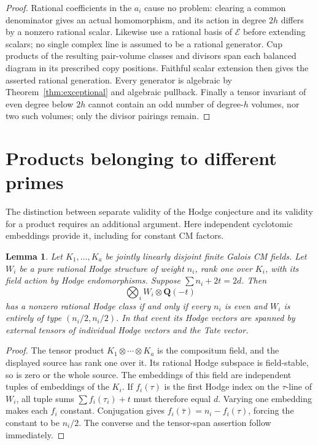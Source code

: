 \documentclass[11pt]{article}
\newtheorem{lemma}[theorem]{Lemma}
\theoremstyle{definition}
\newcommand{\Q}{\mathbf Q}
\begin{document}
\begin{proof}
Rational coefficients in the $a_i$ cause no problem: clearing a common
denominator gives an actual homomorphism, and its action in degree $2h$
differs by a nonzero rational scalar. Likewise use a rational basis of
$\mathscr E$ before extending scalars; no single complex line is assumed
to be a rational generator. Cup products of the resulting pair-volume
classes and divisors span each balanced diagram in its prescribed copy
positions. Faithful scalar extension then gives the asserted rational
generation. Every generator is algebraic by Theorem~\ref{thm:exceptional}
and algebraic pullback. Finally a tensor invariant of even degree below
$2h$ cannot contain an odd number of degree-$h$ volumes, nor two such
volumes; only the divisor pairings remain.
\end{proof}

\section{Products belonging to different primes}\label{sec:products}
The distinction between separate validity of the Hodge conjecture and its
validity for a product requires an additional argument. Here independent
cyclotomic embeddings provide it, including for constant CM factors.

\begin{lemma}\label{lem:fields}
Let $K_1,\ldots,K_a$ be jointly linearly disjoint finite Galois CM fields.
Let $W_i$ be a pure rational Hodge structure of weight $n_i$, rank one
over $K_i$, with its field action by Hodge endomorphisms. Suppose
$\sum n_i+2t=2d$. Then
\[
                  \bigotimes_i W_i\otimes\Q(-t)
\]
has a nonzero rational Hodge class if and only if every $n_i$ is even
and $W_i$ is entirely of type $(n_i/2,n_i/2)$. In that event its Hodge
vectors are spanned by external tensors of individual Hodge vectors and
the Tate vector.
\end{lemma}
\begin{proof}
The tensor product $K_1\otimes\cdots\otimes K_a$ is the compositum
field, and the displayed source has rank one over it. Its rational Hodge
subspace is field-stable, so is zero or the whole source. The embeddings
of this field are independent tuples of embeddings of the $K_i$.
If $f_i(\tau)$ is the first Hodge index on the $\tau$-line of $W_i$,
all tuple sums $\sum f_i(\tau_i)+t$ must therefore equal $d$.
Varying one embedding makes each $f_i$ constant. Conjugation gives
$f_i(\bar\tau)=n_i-f_i(\tau)$, forcing the constant to be $n_i/2$.
The converse and the tensor-span assertion follow immediately.
\end{proof}
\end{document}
